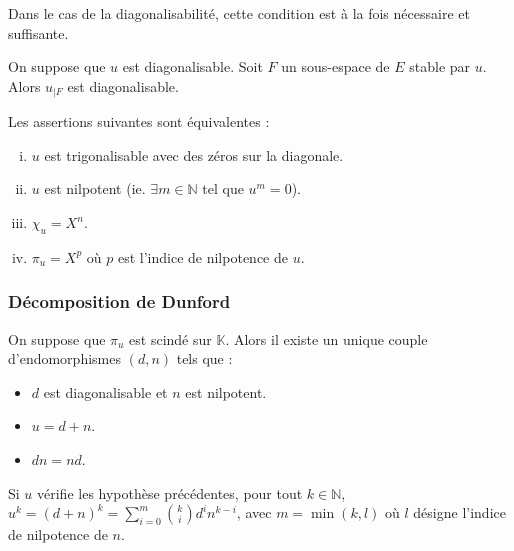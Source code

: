 	\begin{remark}
		Dans le cas de la diagonalisabilité, cette condition est à la fois nécessaire et suffisante.
	\end{remark}
	
	
	\begin{proposition}
		On suppose que $u$ est diagonalisable. Soit $F$ un sous-espace de $E$ stable par $u$. Alors $u_{|F}$ est diagonalisable.
	\end{proposition}
	
	
	\begin{application}
		Les assertions suivantes sont équivalentes :
		\begin{enumerate}[(i)]
			\item $u$ est trigonalisable avec des zéros sur la diagonale.
			\item $u$ est nilpotent (ie. $\exists m \in \mathbb{N}$ tel que $u^m = 0$).
			\item $\chi_u = X^n$.
			\item $\pi_u = X^p$ où $p$ est l'indice de nilpotence de $u$.
		\end{enumerate}
	\end{application}
	
	\subsubsection{Décomposition de Dunford}
	
	
	\begin{theorem}
		On suppose que $\pi_u$ est scindé sur $\mathbb{K}$. Alors il existe un unique couple d'endomorphismes $(d, n)$ tels que :
		\begin{itemize}
			\item $d$ est diagonalisable et $n$ est nilpotent.
			\item $u = d + n$.
			\item $d n = n d$.
		\end{itemize}
	\end{theorem}
	
	\begin{corollary}
		Si $u$ vérifie les hypothèse précédentes, pour tout $k \in \mathbb{N}$, $u^k = (d + n)^k = \sum_{i=0}^m \binom{k}{i} d^i n^{k-i}$, avec $m = \min(k, l)$ où $l$ désigne l'indice de nilpotence de $n$.
	\end{corollary}
	
